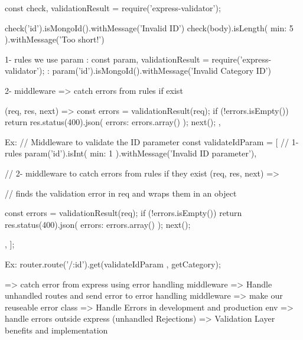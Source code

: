                const { check, validationResult } = require('express-validator');

               check('id').isMongoId().withMessage('Invalid ID')
               check(body).isLength({ min: 5 }).withMessage('Too short!')

           

            1- rules 
                we use param 
                :  const { param, validationResult } = require('express-validator');
                : param('id').isMongoId().withMessage('Invalid Category ID')
                
            2- middleware => catch errors from rules if exist

                 (req, res, next) => {
                        const errors = validationResult(req);
                        if (!errors.isEmpty()) {
                            return res.status(400).json({ errors: errors.array() });
                        }
                        next();
                    },


             Ex: // Middleware to validate the ID parameter
                        const validateIdParam = [
                            // 1- rules
                            param('id').isInt({ min: 1 }).withMessage('Invalid ID parameter'),

                            // 2- middleware to catch errors from rules if  they exist
                            (req, res, next) => {
                                // finds the validation error in req and wraps them in an object

                                const errors = validationResult(req);
                                if (!errors.isEmpty()) {
                                return res.status(400).json({ errors: errors.array() });
                                }
                                next();
                            },
                        ];


                    Ex: router.route('/:id').get(validateIdParam , getCategory);







   => catch error from express using error handling middleware 
   => Handle unhandled routes and send error to error handling middleware 
   => make our reuseable error class
   => Handle Errors in development and production env 
   => handle errors outside express (unhandled Rejections)
   => Validation Layer benefits and implementation


